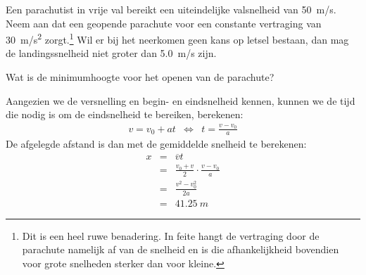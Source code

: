 \documentclass{ximera}
\begin{document}
\begin{exercise}
    Een parachutist in vrije val bereikt een uiteindelijke valsnelheid van \SI{50}{m/s}. Neem aan dat een geopende parachute voor een constante vertraging van \SI{30}{m/s^2} zorgt.\footnote{Dit is een heel ruwe benadering. In feite hangt de vertraging door de parachute namelijk af van de snelheid en is die afhankelijkheid bovendien voor grote snelheden sterker dan voor kleine.} Wil er bij het neerkomen geen kans op letsel bestaan, dan mag de landingssnelheid niet groter dan \SI{5,0}{m/s} zijn.

    Wat is de minimumhoogte voor het openen van de parachute?
    \begin{oplossing}
        Aangezien we de versnelling en begin- en eindsnelheid kennen, kunnen we de tijd die nodig is om de eindsnelheid te bereiken, berekenen:
        \begin{eqnarray*}
            v=v_0+at&\Leftrightarrow&t=\frac{v-v_0}{a}
        \end{eqnarray*}
        De afgelegde afstand is dan met de gemiddelde snelheid te berekenen:
        \begin{eqnarray*}
            x&=&\overline{v}t\\
            &=&\frac{v_0+v}{2}\cdot\frac{v-v_0}{a}\\
            &=&\frac{v^2-v_0^2}{2a}\\
            &=&\SI{41,25}{m}
        \end{eqnarray*}
    \end{oplossing}
\end{exercise}
\end{document}
